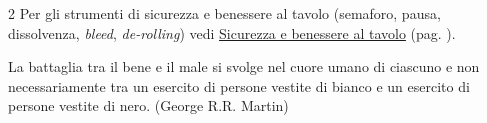 \begin{multicols}{2}
Per gli strumenti di sicurezza e benessere al tavolo (semaforo, pausa, dissolvenza, \emph{bleed}, \emph{de-rolling}) vedi \hyperlink{sicurezzatavolo}{Sicurezza e benessere al tavolo} (pag. \pageref{sicurezzatavolo}).



\end{multicols}

\vfill

\begin{enfasi}
	La battaglia tra il bene e il male si svolge nel cuore umano di ciascuno e non necessariamente tra un esercito di persone vestite di bianco e un esercito di persone vestite di nero. (George R.R. Martin)
\end{enfasi}

\pagebreak

